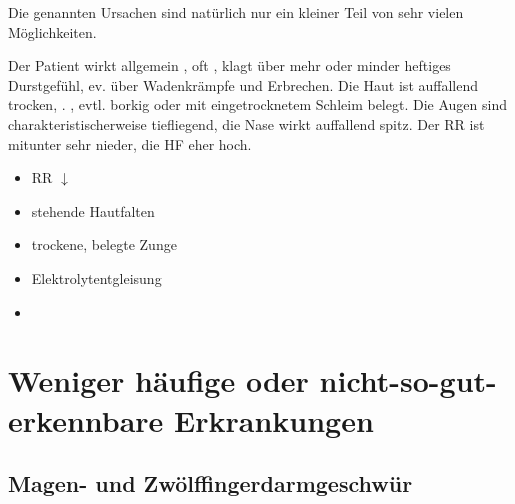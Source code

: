 Die genannten Ursachen sind natürlich nur ein kleiner Teil
von sehr vielen Möglichkeiten.

{%
Der Patient wirkt allgemein , oft
, klagt über mehr oder minder heftiges
Durstgefühl, ev. über Wadenkrämpfe und Erbrechen. Die Haut
ist auffallend trocken, . , evtl.
borkig oder mit eingetrocknetem Schleim belegt. Die Augen
sind charakteristischerweise tiefliegend, die Nase wirkt
auffallend spitz. Der RR ist mitunter sehr nieder, die HF
eher hoch. 
}{
\begin{itemize}
    \item RR ${\downarrow}$
    \item stehende Hautfalten
    \item trockene, belegte Zunge
    \item Elektrolytentgleisung
    \item {}
\end{itemize}
}{}{}{}



\section{Weniger häufige oder nicht-so-gut-erkennbare Erkrankungen}

% 




\subsection{Magen- und Zwölffingerdarmgeschwür}
\label{topic:gastritis}

